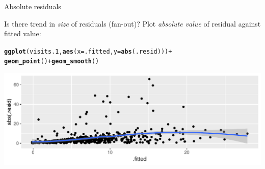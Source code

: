 \documentclass[unknownkeysallowed]{beamer}\usepackage[]{graphicx}\usepackage[]{color}
\makeatletter
\def\maxwidth{ %
  \ifdim\Gin@nat@width>\linewidth
    \linewidth
  \else
    \Gin@nat@width
  \fi
}
\newcommand{\hlopt}[1]{\textcolor[rgb]{0,0,0}{#1}}%
\newcommand{\hlstd}[1]{\textcolor[rgb]{0.345,0.345,0.345}{#1}}%
\newcommand{\hlkwc}[1]{\textcolor[rgb]{0.333,0.667,0.333}{#1}}%
\newcommand{\hlkwd}[1]{\textcolor[rgb]{0.737,0.353,0.396}{\textbf{#1}}}%
\newenvironment{kframe}{%
 \def\at@end@of@kframe{}%
 \ifinner\ifhmode%
  \def\at@end@of@kframe{\end{minipage}}%
  \begin{minipage}{\columnwidth}%
 \fi\fi%
 \def\FrameCommand##1{\hskip\@totalleftmargin \hskip-\fboxsep
 \colorbox{shadecolor}{##1}\hskip-\fboxsep
     \hskip-\linewidth \hskip-\@totalleftmargin \hskip\columnwidth}%
 \MakeFramed {\advance\hsize-\width
   \@totalleftmargin\z@ \linewidth\hsize
   \@setminipage}}%
 {\par\unskip\endMakeFramed%
 \at@end@of@kframe}
\newenvironment{knitrout}{}{} %
\makeatother
\begin{document}
\begin{frame}[fragile]{Absolute residuals}
  
Is there trend in \emph{size} of residuals (fan-out)? Plot
\emph{absolute value} of residual against fitted value:

\begin{knitrout}
\color{fgcolor}\begin{kframe}
\begin{alltt}
\hlkwd{ggplot}\hlstd{(visits.1,}\hlkwd{aes}\hlstd{(}\hlkwc{x}\hlstd{=.fitted,}\hlkwc{y}\hlstd{=}\hlkwd{abs}\hlstd{(.resid)))}\hlopt{+}
  \hlkwd{geom_point}\hlstd{()}\hlopt{+}\hlkwd{geom_smooth}\hlstd{()}
\end{alltt}


{\ttfamily\noindent\itshape{}}\end{kframe}
\includegraphics[width=\maxwidth]{figure/unnamed-chunk-31-1} 

\end{knitrout}
  
\end{frame}
\end{document}
